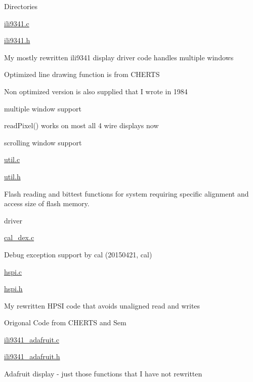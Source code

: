 \begin{DoxyParagraph}{Directories}
\begin{DoxyItemize}
\begin{DoxyItemize}
\item \hyperlink{ili9341_8c}{ili9341.\-c}
\item \hyperlink{ili9341_8h}{ili9341.\-h}
\begin{DoxyItemize}
\item My mostly rewritten ili9341 display driver code handles multiple windows
\begin{DoxyItemize}
\item Optimized line drawing function is from C\-H\-E\-R\-T\-S
\item Non optimized version is also supplied that I wrote in 1984
\item multiple window support
\item read\-Pixel() works on most all 4 wire displays now
\item scrolling window support
\end{DoxyItemize}
\end{DoxyItemize}
\item \hyperlink{util_8c}{util.\-c}
\item \hyperlink{util_8h}{util.\-h}
\begin{DoxyItemize}
\item Flash reading and bittest functions for system requiring specific alignment and access size of flash memory.
\end{DoxyItemize}
\end{DoxyItemize}
\item driver
\begin{DoxyItemize}
\item \hyperlink{cal__dex_8c}{cal\-\_\-dex.\-c}
\begin{DoxyItemize}
\item Debug exception support by cal (20150421, cal)
\end{DoxyItemize}
\item \hyperlink{hspi_8c}{hspi.\-c}
\item \hyperlink{hspi_8h}{hspi.\-h}
\begin{DoxyItemize}
\item My rewritten H\-P\-S\-I code that avoids unaligned read and writes
\item Origonal Code from C\-H\-E\-R\-T\-S and Sem
\end{DoxyItemize}
\item \hyperlink{ili9341__adafruit_8c}{ili9341\-\_\-adafruit.\-c}
\item \hyperlink{ili9341__adafruit_8h}{ili9341\-\_\-adafruit.\-h}
\begin{DoxyItemize}
\item Adafruit display -\/ just those functions that I have not rewritten
\end{DoxyItemize}
\end{DoxyItemize}
\end{DoxyItemize}
\end{DoxyParagraph}

